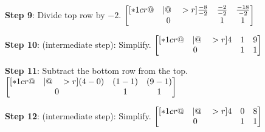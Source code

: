 \documentclass[12pt,tiks]{article}
\begin{document}
    \hspace{.1in}\vspace{.5in}
    
    \begin{minipage}[t][.7in][t]{3in}\RaggedRight
    \-\vspace*{.1in}
    \textbf{Step 9}: Divide top row by $-2$.
     $
            \begin{bmatrix}[*1cr@{\quad}|@{\quad}>{\color{black}}r]
              \frac{-8}{-2} & \frac{-2}{-2} & \frac{-18}{-2} \\
              0 & 1 & 1
            \end{bmatrix}
        $
    \end{minipage}
    \hspace{.1in}
    \begin{minipage}[t][.7in][t]{3in}\RaggedRight
    \-\vspace*{.1in}
    \textbf{Step 10}: (intermediate step): Simplify.
        $
            \begin{bmatrix}[*1cr@{\quad}|@{\quad}>{\color{black}}r]
              4 & 1 & 9 \\
              0 & 1 & 1
            \end{bmatrix}
        $
    \end{minipage}
    
    \hspace{.1in}\vspace{.5in}
    
    \begin{minipage}[t][.7in][t]{3in}\RaggedRight
    \-\vspace*{.1in}
    \textbf{Step 11}: Subtract the bottom row from the top.
        $
            \begin{bmatrix}[*1cr@{\quad}|@{\quad}>{\color{black}}r]
              ({4-0}) & ({1-1}) & ({9-1}) \\
              0 & 1 & 1
            \end{bmatrix}
        $
    \end{minipage}
    \hspace{.1in}
    \begin{minipage}[t][.7in][t]{3in}\RaggedRight
    \-\vspace*{.1in}
    \textbf{Step 12}: (intermediate step): Simplify.
        $
            \begin{bmatrix}[*1cr@{\quad}|@{\quad}>{\color{black}}r]
              4 & 0 & 8 \\
              0 & 1 & 1
            \end{bmatrix}
        $
    \end{minipage}
    
\end{document}
